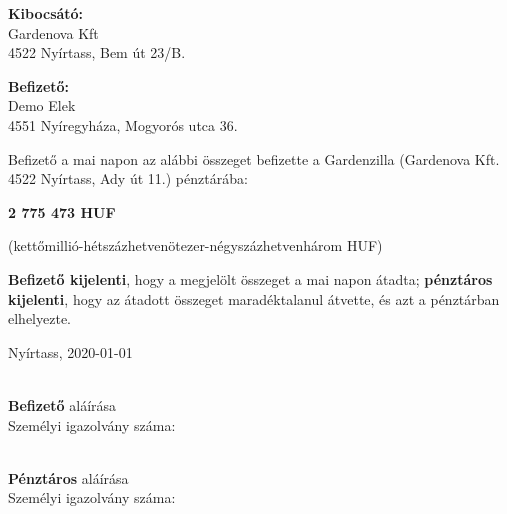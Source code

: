 \documentclass{article}
\begin{document}
\rule[2\baselineskip]{0pt}{0pt}%
\begin{minipage}[t]{0.45\textwidth}
  \textbf {Kibocsátó:}\\
  Gardenova Kft\\
  4522 Nyírtass, Bem út 23/B.
\end{minipage}
\hfill
\begin{minipage}[t]{0.45\textwidth}
  \textbf {Befizető:}\\
  Demo Elek\\
  4551 Nyíregyháza, Mogyorós utca 36.
\end{minipage}

\rule[4\baselineskip]{0pt}{0pt}%

\begin{minipage}[t]{0.9\textwidth}
  {\normalsize Befizető a mai napon az alábbi összeget befizette a Gardenzilla (Gardenova Kft. 4522 Nyírtass, Ady út 11.) pénztárába:}

  \begin{center}
    {\bf \Large 2 775 473 HUF}

    {\small (kettőmillió-hétszázhetvenötezer-négyszázhetvenhárom HUF)}
  \end{center}

  \bigskip

  {\bf Befizető kijelenti}, hogy a megjelölt összeget a mai napon átadta; {\bf pénztáros kijelenti}, hogy az átadott összeget maradéktalanul átvette, és azt a pénztárban elhelyezte.

  \rule[2\baselineskip]{0pt}{0pt}

  Nyírtass, 2020-01-01
\end{minipage}

\rule[2\baselineskip]{0pt}{0pt}

\begin{minipage}[t]{0.45\textwidth}
  \makebox[2.5in]{\hrulefill} \\
  {\bf Befizető} aláírása \\
  Személyi igazolvány száma:
\end{minipage}
\hfill
\begin{minipage}[t]{0.45\textwidth}
  \makebox[2.5in]{\hrulefill} \\
  {\bf Pénztáros} aláírása\\
  Személyi igazolvány száma:
\end{minipage}
\end{document}
